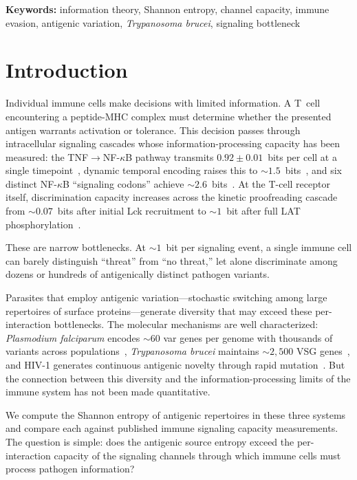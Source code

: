 \documentclass[twocolumn,10pt]{article}
\begin{document}
\smallskip
\noindent\textbf{Keywords:} information theory, Shannon entropy, channel capacity, immune evasion, antigenic variation, \textit{Trypanosoma brucei}, signaling bottleneck

\section{Introduction}
\label{sec:intro}

Individual immune cells make decisions with limited information.  A T~cell encountering a peptide-MHC complex must determine whether the presented antigen warrants activation or tolerance.  This decision passes through intracellular signaling cascades whose information-processing capacity has been measured: the TNF$\to$NF-$\kappa$B pathway transmits $0.92 \pm 0.01$~bits per cell at a single timepoint~\citep{cheong2011}, dynamic temporal encoding raises this to ${\sim}1.5$~bits~\citep{selimkhanov2014}, and six distinct NF-$\kappa$B ``signaling codons'' achieve ${\sim}2.6$~bits~\citep{adelaja2021}.  At the T-cell receptor itself, discrimination capacity increases across the kinetic proofreading cascade from ${\sim}0.07$~bits after initial Lck recruitment to ${\sim}1$~bit after full LAT phosphorylation~\citep{ganti2020}.

These are narrow bottlenecks.  At ${\sim}1$~bit per signaling event, a single immune cell can barely distinguish ``threat'' from ``no threat,'' let alone discriminate among dozens or hundreds of antigenically distinct pathogen variants.

Parasites that employ antigenic variation---stochastic switching among large repertoires of surface proteins---generate diversity that may exceed these per-interaction bottlenecks.  The molecular mechanisms are well characterized: \textit{Plasmodium falciparum} encodes ${\sim}60$ var genes per genome with thousands of variants across populations~\citep{otto2019}, \textit{Trypanosoma brucei} maintains ${\sim}2{,}500$ VSG genes~\citep{mugnier2015}, and HIV-1 generates continuous antigenic novelty through rapid mutation~\citep{haynes2012}.  But the connection between this diversity and the information-processing limits of the immune system has not been made quantitative.

We compute the Shannon entropy of antigenic repertoires in these three systems and compare each against published immune signaling capacity measurements.  The question is simple: does the antigenic source entropy exceed the per-interaction capacity of the signaling channels through which immune cells must process pathogen information?
\end{document}
